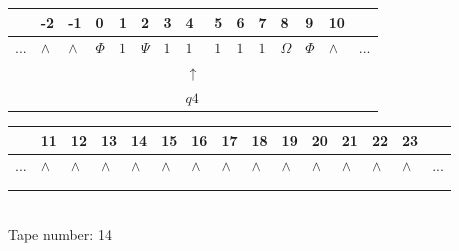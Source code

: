 \documentclass[11pt]{article}
\begin{document}
\begin{table}[H]
\centering
\begin{tabular}{lllllllllllllll}
 & -2 & -1 & 0 & 1 & 2 & 3 & 4 & 5 & 6 & 7 & 8 & 9 & 10 & \\
\hline
$...$ & \multicolumn{1}{|l|}{$\wedge$} & \multicolumn{1}{|l|}{$\wedge$} & \multicolumn{1}{|l|}{$\Phi$} & \multicolumn{1}{|l|}{$1$} & \multicolumn{1}{|l|}{$\Psi$} & \multicolumn{1}{|l|}{$1$} & \multicolumn{1}{|l|}{$1$} & \multicolumn{1}{|l|}{$1$} & \multicolumn{1}{|l|}{$1$} & \multicolumn{1}{|l|}{$1$} & \multicolumn{1}{|l|}{$\Omega$} & \multicolumn{1}{|l|}{$\Phi$} & \multicolumn{1}{|l|}{$\wedge$} & $...$\\
\hline
&  &  &  &  &  &  & $\uparrow$ &  &  &  &  &  &  &  \\
&  &  &  &  &  &  & $ q4 $ &  &  &  &  &  &  &  \\
\end{tabular}
\begin{tabular}{lllllllllllllll}
 & 11 & 12 & 13 & 14 & 15 & 16 & 17 & 18 & 19 & 20 & 21 & 22 & 23 & \\
\hline
$...$ & \multicolumn{1}{|l|}{$\wedge$} & \multicolumn{1}{|l|}{$\wedge$} & \multicolumn{1}{|l|}{$\wedge$} & \multicolumn{1}{|l|}{$\wedge$} & \multicolumn{1}{|l|}{$\wedge$} & \multicolumn{1}{|l|}{$\wedge$} & \multicolumn{1}{|l|}{$\wedge$} & \multicolumn{1}{|l|}{$\wedge$} & \multicolumn{1}{|l|}{$\wedge$} & \multicolumn{1}{|l|}{$\wedge$} & \multicolumn{1}{|l|}{$\wedge$} & \multicolumn{1}{|l|}{$\wedge$} & \multicolumn{1}{|l|}{$\wedge$} & $...$\\
\hline
&  &  &  &  &  &  &  &  &  &  &  &  &  &  \\
&  &  &  &  &  &  &  &  &  &  &  &  &  &  \\
\end{tabular}
\\
Tape number: 14
\noindent\makebox[\linewidth]{\hdashrule{\textwidth}{1pt}{1pt}}\end{table}
\end{document}
